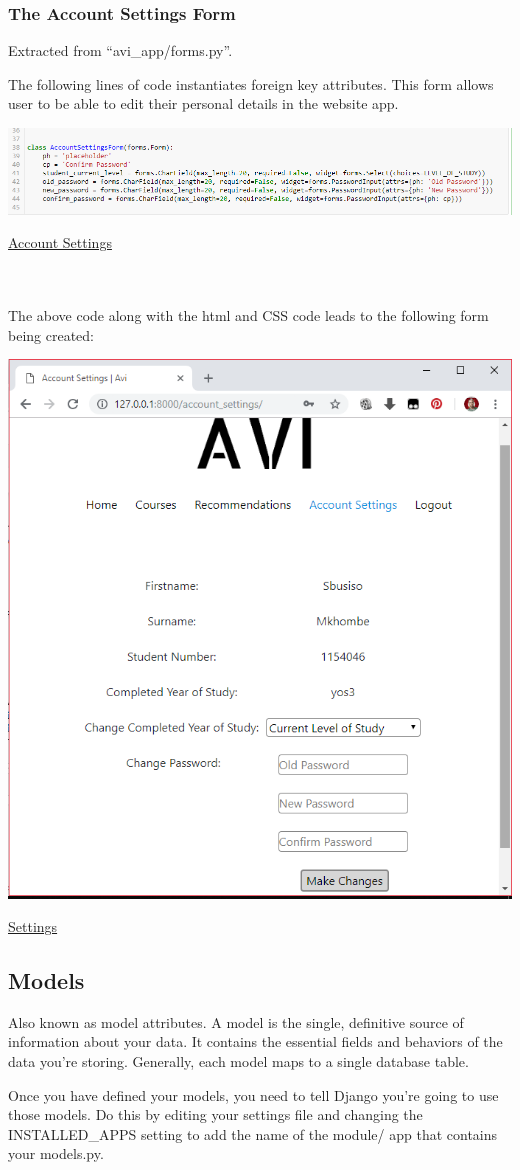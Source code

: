 \documentclass[10pt]{article}
\begin{document}
\subsubsection{The  Account Settings Form}

Extracted from “avi\_app/forms.py”.

The following lines of code instantiates foreign key attributes. This form allows user to be able to edit their personal details in the website app.

\begin{center}
\includegraphics[width=.9\textwidth]{Aform.png}
\end{center}
\caption{\underline{Account Settings}} \\ \\

The above code along with the html and CSS code leads to the following form being created:

\begin{center}
\includegraphics[width=.4\textwidth]{settings.png}
\end{center}
\caption{\underline{Settings}}

\subsection{Models}

Also known as model attributes. A model is the single, definitive source of information about your data. It contains the essential fields and behaviors of the data you’re storing. Generally, each model maps to a single database table.

Once you have defined your models, you need to tell Django you’re going to use those models. Do this by editing your settings file and changing the INSTALLED\_APPS setting to add the name of the module/ app that contains your models.py.
\end{document}
